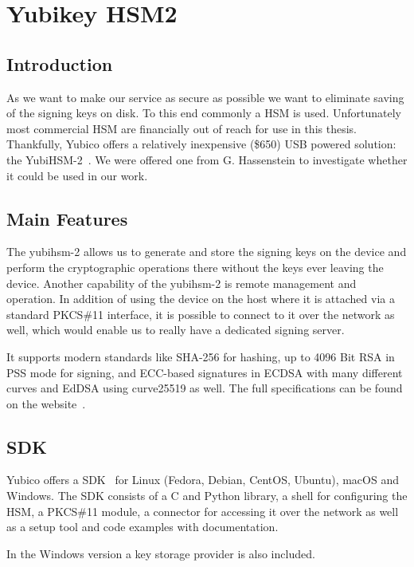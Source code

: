 \chapter{Yubikey HSM2}

\section{Introduction}\label{sec:introduction}
As we want to make our service as secure as possible we want to eliminate saving of the signing keys on disk.
To this end commonly a \gls{HSM} is used.
Unfortunately most commercial \gls{HSM} are financially out of reach for use in this thesis.
Thankfully, Yubico offers a relatively inexpensive (\$650) \gls{USB} powered solution: the YubiHSM-2~\cite{yubihsm}.
We were offered one from G. Hassenstein to investigate whether it could be used in our work.

\section{Main Features}\label{sec:technical-specification}
The yubihsm-2 allows us to generate and store the signing keys on the device and perform the cryptographic operations there without the keys ever leaving the device.
Another capability of the yubihsm-2 is remote management and operation.
In addition of using the device on the host where it is attached via a standard \gls{PKCS}\#11 interface,
it is possible to connect to it over the network as well,
which would enable us to really have a dedicated signing server.

It supports modern standards like \gls{SHA-256} for hashing, up to 4096 Bit \gls{RSA} in \gls{PSS} mode for signing,
and \gls{ECC}-based signatures in \gls{ECDSA} with many different curves and \gls{EdDSA} using curve25519 as well.
The full specifications can be found on the website~\cite{yubihsm}.

\section{SDK}\label{sec:sdk}
Yubico offers a \gls{SDK}~\cite{yubihsm} for Linux (Fedora, Debian, CentOS, Ubuntu), macOS and Windows.
The \gls{SDK} consists of a C and Python library, a shell for configuring the \gls{HSM},
a \gls{PKCS}\#11 module,
a connector for accessing it over the network as well as a setup tool and code examples with documentation.

In the Windows version a key storage provider is also included.

